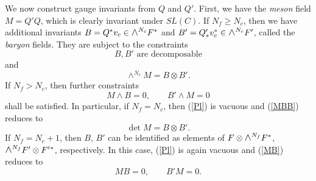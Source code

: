\documentclass[lecture]{qft-l}
\newcommand{\medwedge}{\mbox{\fontsize{12pt}{0pt}\selectfont $\wedge$}}
\newcommand{\FT}{F'}%
\newcommand{\QT}{Q'}%
\newcommand{\BT}{B'}%
\numberwithin{figure}{chapter}
\begin{document}
We now construct gauge invariants from $Q$ and $\QT$.
First, we have the {\em meson} field $M=\QT Q$, 
which is clearly invariant 
under $SL(C)$.
If $N_f\ge N_c$, then we have additional invariants 
$B=Q^*v_c\in\medwedge^{N_c}F^*$ 
and $\BT=\QT_*v_c^*\in\medwedge^{N_c}\FT$,
called the {\em baryon} fields.
They are subject to the constraints
	\begin{equation}\label{Pl}
B, \BT\mbox{ are decomposable}
	\end{equation}
and
	\begin{equation}\label{MBB}
\wedge^{N_c}M=B\otimes\BT.
	\end{equation}
If $N_f>N_c$, then further constraints
	\begin{equation}\label{MB}
M\wedge B=0,\quad\quad\BT\wedge M=0
	\end{equation}
shall be satisfied.
In particular, if $N_f=N_c$, then (\ref{Pl}) 
is vacuous and (\ref{MBB})
reduces to
	\begin{equation}\label{MBB0}
\det M=B\otimes\BT.
	\end{equation}
If $N_f=N_c+1$, then $B$, $\BT$ can be identified as elements of 
$F\otimes\medwedge^{N_f}F^*$, $\medwedge^{N_f}\FT\otimes\FT{^{*}}$, respectively.
In this case, (\ref{Pl}) is again vacuous and (\ref{MB}) reduces to
	\begin{equation}\label{MB1}
MB=0,\quad\quad\BT M=0.
	\end{equation}
\end{document}
